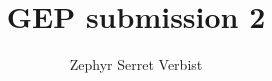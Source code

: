 \documentclass[12pt]{article}
\title{GEP submission 2}
\author{Zephyr Serret Verbist}
\theoremstyle{definition}
\begin{document}
\begin{titlepage}

\end{titlepage}

\renewcommand*\contentsname{Table of contents}
\tableofcontents
\listoffigures
\listoftables
\newpage












\newpage
%


\end{document}
